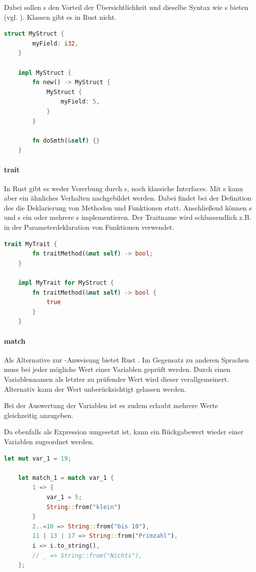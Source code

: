 \documentclass[11pt,a4paper, ngerman]{article}
\begin{document}
Dabei sollen s den Vorteil der Übersichtlichkeit und dieselbe Syntax wie s bieten (vgl. \cite[S. 91]{BO18}). Klassen gibt es in Rust nicht.

\begin{lstlisting}[language=rust, caption={struct}]
    struct MyStruct {
        myField: i32,
    }

    impl MyStruct {
        fn new() -> MyStruct {
            MyStruct {
                myField: 5,
            }
        }

        fn doSmth(&self) {}
    }
\end{lstlisting}
\paragraph{trait} In Rust gibt es weder Vererbung durch s, noch klassiche Interfaces. Mit s kann aber ein ähnliches Verhalten nachgebildet werden. Dabei findet bei der Definition des  die Deklarierung von Methoden und Funktionen statt. Anschließend können s und s ein oder mehrere s implementieren. Der Traitname wird schlussendlich z.B. in der Parameterdeklaration von Funktionen verwendet.

\begin{lstlisting}[language=rust, caption={trait}]
    trait MyTrait {
        fn traitMethod(&mut self) -> bool;
    }

    impl MyTrait for MyStruct {
        fn traitMethod(&mut self) -> bool {
            true
        }
    }
\end{lstlisting}
\paragraph{match} Als Alternative zur -Anweisung bietet Rust . Im Gegensatz zu anderen Sprachen muss bei  jeder mögliche Wert einer Variablen geprüft werden. Durch einen Variablennamen als letzter zu prüfender Wert wird dieser verallgemeinert. Alternativ kann der Wert unberücksichtigt gelassen werden.

Bei der Auswertung der Variablen ist es zudem erlaubt mehrere Werte gleichzeitig anzugeben.

Da  ebenfalls als Expression umgesetzt ist, kann ein Rückgabewert wieder einer Variablen zugeordnet werden.

\begin{lstlisting}[language=rust, caption={match}]
    let mut var_1 = 19;

    let match_1 = match var_1 {
        1 => {
            var_1 = 5;
            String::from("klein")
        }
        2..=10 => String::from("bis 10"),
        11 | 13 | 17 => String::from("Primzahl"),
        i => i.to_string(),
        // _ => String::from("Nichts"),
    };
\end{lstlisting}
\end{document}
